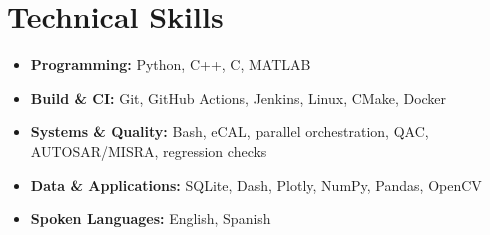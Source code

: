 \section{Technical Skills}
\begin{itemize}[leftmargin=0.15in, label={}, itemsep=0pt, parsep=0pt]
    \small
    \item \textbf{Programming:} Python, C++, C, MATLAB
    \item \textbf{Build \& CI:} Git, GitHub Actions, Jenkins, Linux, CMake, Docker
    \item \textbf{Systems \& Quality:} Bash, eCAL, parallel orchestration, QAC, AUTOSAR/MISRA, regression checks
    \item \textbf{Data \& Applications:} SQLite, Dash, Plotly, NumPy, Pandas, OpenCV
    \item \textbf{Spoken Languages:} English, Spanish
\end{itemize}